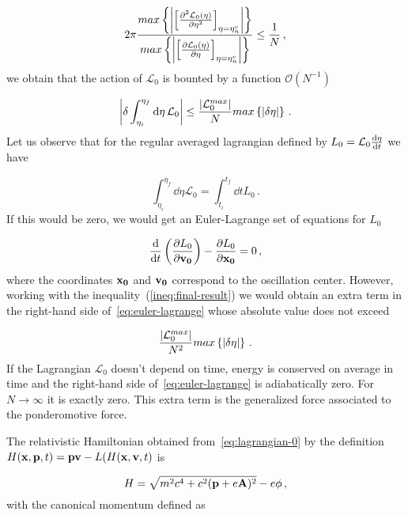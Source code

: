 \documentclass[12pt, class=report, crop=false]{standalone}
\begin{document}
\begin{equation}
  2 \pi \frac{max\left\{\abs{\left[\pdv[2]{\mathcal{L}_0 (\eta)}{\eta} \right]_{\eta = \eta_n^c}}\right\}}{max\left\{\abs{\left[\pdv{\mathcal{L}_0 (\eta)}{\eta} \right]_{\eta = \eta_n^c}}\right\}} \leq \frac{1}{N}\,,
\end{equation}
we obtain that the action of \(\mathcal{L}_0\) is bounted by a function \(\mathcal{O}(N^{-1})\)

\begin{equation}
  \label{ineq:final-result}
  \abs{\delta \int_{\eta_i}^{\eta_f} \dd{\eta} \mathcal{L}_0} \leq \frac{\abs{\mathcal{L}_0^{max}}}{N} max\left\{\abs{\delta \eta}\right\}\,.
\end{equation}
Let us observe that for the regular averaged lagrangian defined by \(L_0 = \mathcal{L}_0 \dv{\eta}{t}\) we have

\begin{equation}
  \int_{\eta_i}^{\eta_f} \dd{\eta} \mathcal{L}_0 = \int_{t_i}^{t_f} \dd{t} L_0\,.
\end{equation}
If this would be zero, we would get an Euler-Lagrange set of equations for \(L_0\)

\begin{equation}
  \label{eq:euler-lagrange}
  \dv{t} \left(\pdv{L_0}{\vb{v_0}}\right) - \pdv{L_0}{\vb{x_0}} = 0\,,
\end{equation}
where the coordinates \(\vb{x_0}\) and \(\vb{v_0}\) correspond to the oscillation center. However, working with the inequality~(\ref{ineq:final-result}) we would obtain an extra term in the right-hand side of~\cref{eq:euler-lagrange} whose absolute value does not exceed

\begin{equation*}
  \frac{\abs{\mathcal{L}_0^{max}}}{N^2} max\left\{\abs{\delta \eta}\right\}\,.
\end{equation*}
If the Lagrangian \(\mathcal{L}_0\) doesn't depend on time, energy is conserved on average in time and the right-hand side of~\cref{eq:euler-lagrange} is adiabatically zero. For \(N\rightarrow\infty\) it is exactly zero. This extra term is the generalized force associated to the ponderomotive force.

The relativistic Hamiltonian obtained from~\cref{eq:lagrangian-0} by the definition \(H(\vb{x},\vb{p},t)=\vb{p}\vb{v}-L(H(\vb{x},\vb{v},t)\) is

\begin{equation}
  H = \sqrt{m^2 c^4 + c^2(\vb{p}+e\vb{A})^2} - e\phi\,,
\end{equation}
with the canonical momentum defined as
\end{document}
